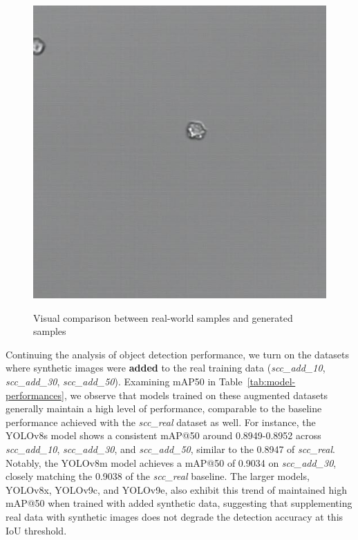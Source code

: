 \begin{figure}
\begin{minipage}[b]{0.49\textwidth}
{\begin{minipage}[t]{0.45\linewidth}
                \includegraphics[width=\linewidth]{sample_03338_40_png.rf.7f345a1b9613d2923272c1843a31434c}
                \label{fig:gen2}
            \end{minipage}
        }
    \end{minipage}
    \caption{Visual comparison between real-world samples  and generated samples }
    \label{fig:comparison}
\end{figure}
Continuing the analysis of object detection performance, we turn on the datasets where synthetic images were \textbf{added} to the real training data (\textit{scc\_add\_10}, \textit{scc\_add\_30}, \textit{scc\_add\_50}).
Examining mAP\@50 in Table~\ref{tab:model-performances}, we observe that models trained on these augmented datasets generally maintain a high level of performance, comparable to the baseline performance achieved with the \textit{scc\_real} dataset as well.
For instance, the YOLOv8s model shows a consistent mAP@50 around 0.8949-0.8952 across \textit{scc\_add\_10}, \textit{scc\_add\_30}, and \textit{scc\_add\_50}, similar to the 0.8947 of \textit{scc\_real}.
Notably, the YOLOv8m model achieves a mAP@50 of 0.9034 on \textit{scc\_add\_30}, closely matching the 0.9038 of the \textit{scc\_real} baseline.
The larger models, YOLOv8x, YOLOv9c, and YOLOv9e, also exhibit this trend of maintained high mAP@50 when trained with added synthetic data, suggesting that supplementing real data with synthetic images does not degrade the detection accuracy at this IoU threshold.

